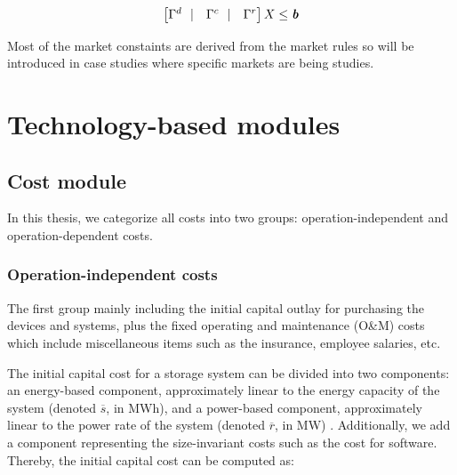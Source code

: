 \begin{equation}
\begin{bmatrix}
\Gamma^d~~|& \Gamma^c~~|&\Gamma^r
\end{bmatrix}
X \leq \textit{\textbf{b}}
\end{equation}

Most of the market constaints are derived from the market rules so will be introduced in case studies where specific markets are being studies. 









\section{Technology-based modules}

\subsection{Cost module}
\label{sec:cost}
In this thesis, we categorize all costs into two groups: operation-independent and operation-dependent costs.

\subsubsection{Operation-independent costs}
The first group mainly including the initial capital outlay for purchasing the devices and systems, plus the fixed operating and maintenance (O\&M) costs which include miscellaneous items such as the insurance, employee salaries, etc. 

The initial capital cost for a storage system can be divided into two components: an energy-based component, approximately linear to the energy capacity of the system (denoted $\overline{s}$, in MWh), and a power-based component, approximately linear to the power rate of the system (denoted $\overline{r}$, in MW) \cite{Megel2017}. Additionally, we add a component representing the size-invariant costs such as the cost for software. Thereby, the initial capital cost can be computed as:

